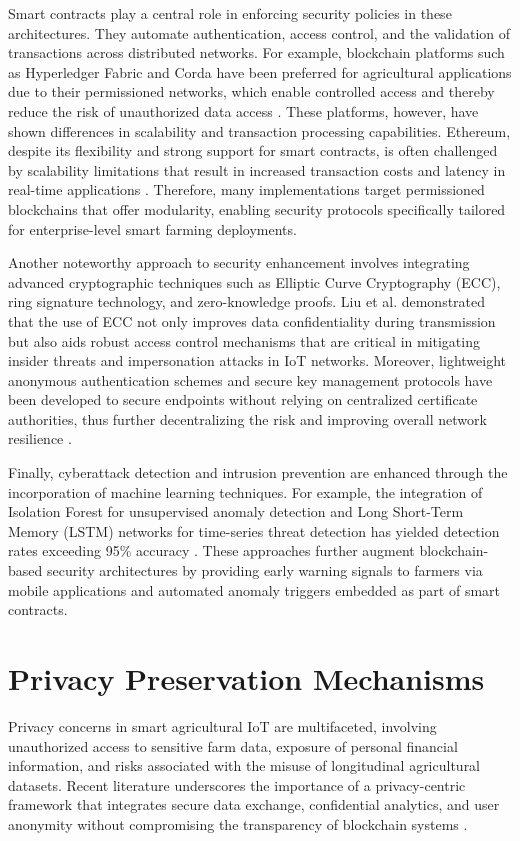 \documentclass[12pt,onecolumn]{IEEEtran} %
\begin{document}
Smart contracts play a central role in enforcing security policies in these architectures. They automate authentication, access control, and the validation of transactions across distributed networks. For example, blockchain platforms such as Hyperledger Fabric and Corda have been preferred for agricultural applications due to their permissioned networks, which enable controlled access and thereby reduce the risk of unauthorized data access \cite{aliyu2023blockchainbasedsmartfarm, soy2025blockchainintegrationin}. These platforms, however, have shown differences in scalability and transaction processing capabilities. Ethereum, despite its flexibility and strong support for smart contracts, is often challenged by scalability limitations that result in increased transaction costs and latency in real-time applications \cite{aliyu2023blockchainbasedsmartfarm}. Therefore, many implementations target permissioned blockchains that offer modularity, enabling security protocols specifically tailored for enterprise-level smart farming deployments.

Another noteworthy approach to security enhancement involves integrating advanced cryptographic techniques such as Elliptic Curve Cryptography (ECC), ring signature technology, and zero-knowledge proofs. Liu et al. demonstrated that the use of ECC not only improves data confidentiality during transmission but also aids robust access control mechanisms that are critical in mitigating insider threats and impersonation attacks in IoT networks. Moreover, lightweight anonymous authentication schemes and secure key management protocols have been developed to secure endpoints without relying on centralized certificate authorities, thus further decentralizing the risk and improving overall network resilience \cite{rai2024enhancingdatasecurity}.

Finally, cyberattack detection and intrusion prevention are enhanced through the incorporation of machine learning techniques. For example, the integration of Isolation Forest for unsupervised anomaly detection and Long Short-Term Memory (LSTM) networks for time-series threat detection has yielded detection rates exceeding 95\% accuracy \cite{daund2025designofan}. These approaches further augment blockchain-based security architectures by providing early warning signals to farmers via mobile applications and automated anomaly triggers embedded as part of smart contracts.

\section{Privacy Preservation Mechanisms}
Privacy concerns in smart agricultural IoT are multifaceted, involving unauthorized access to sensitive farm data, exposure of personal financial information, and risks associated with the misuse of longitudinal agricultural datasets. Recent literature underscores the importance of a privacy-centric framework that integrates secure data exchange, confidential analytics, and user anonymity without compromising the transparency of blockchain systems \cite{rahaman2024privacycentricaiand}.
\end{document}
